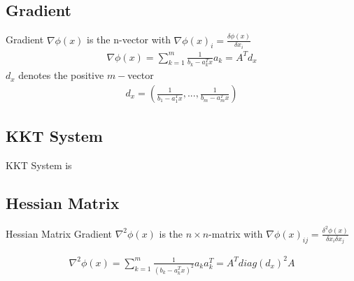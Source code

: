 \subsection*{Gradient}
Gradient $\nabla \phi(x)$ is the n-vector with $\nabla \phi(x)_i = \frac{\delta \phi (x)}{\delta x_i}$
\begin{equation*}
	\begin{aligned}
		\nabla \phi(x) = \sum_{k=1}^{m} \frac{1}{b_k-a_k^Tx}a_k = A^Td_x 
	\end{aligned}
\end{equation*}
$d_x$ denotes the positive $m-$vector
\begin{equation*}
	\begin{aligned}
		d_x = \left( \frac{1}{b_1-a_1^Tx},..., \frac{1}{b_m-a_m^Tx} \right)
	\end{aligned}
\end{equation*}


\subsection*{KKT System}
KKT System is

\subsection*{Hessian Matrix}
Hessian Matrix Gradient $\nabla^2 \phi(x)$ is the $n\times n$-matrix with $\nabla \phi (x)_{ij} = \frac{\delta^2 \phi (x)}{\delta x_i \delta x_j}$

\begin{equation*}
	\begin{aligned}
		\nabla^2 \phi(x) = \sum_{k=1}^{m} \frac{1}{(b_k-a_k^Tx)^2} a_k a_k^T = A^T diag(d_x)^2 A 
	\end{aligned}
\end{equation*}

